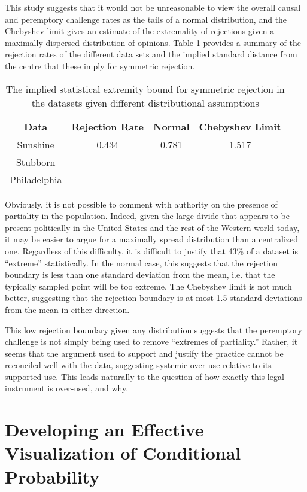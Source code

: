 This study suggests that it would not be unreasonable to view the overall causal and peremptory challenge rates as the tails of a
normal distribution, and the Chebyshev limit gives an estimate of the extremality of rejections given a maximally dispersed
distribution of opinions. Table \ref{tab:rejbounds} provides a summary of the rejection rates of the different data sets and the
implied standard distance from the centre that these imply for symmetric rejection.

\begin{table}
  \centering
  \label{tab:rejbounds}
  \caption[Implied Rejection Boundaries]{The implied statistical extremity bound for symmetric rejection in the datasets given
    different distributional assumptions}
  \begin{tabular}{|c|c|c|c|} \hline
    Data & Rejection Rate & Normal & Chebyshev Limit \\ \hline
    Sunshine & 0.434 & 0.781 & 1.517 \\
    Stubborn & & & \\
    Philadelphia & & & \\
    \hline
  \end{tabular}
\end{table}

Obviously, it is not possible to comment with authority on the presence of partiality in the population. Indeed, given the large
divide that appears to be present politically in the United States and the rest of the Western world today, it may be easier to
argue for a maximally spread distribution than a centralized one. Regardless of this difficulty, it is difficult to justify that
43\% of a dataset is ``extreme'' statistically. In the normal case, this suggests that the rejection boundary is less than one
standard deviation from the mean, i.e. that the typically sampled point will be too extreme. The Chebyshev limit is not much
better, suggesting that the rejection boundary is at most 1.5 standard deviations from the mean in either direction.

This low rejection boundary given any distribution suggests that the peremptory challenge is not simply being used to remove
``extremes of partiality.'' Rather, it seems that the argument used to support and justify the practice cannot be reconciled well
with the data, suggesting systemic over-use relative to its supported use. This leads naturally to the question of how exactly
this legal instrument is over-used, and why.

\section{Developing an Effective Visualization of Conditional Probability} \label{sec:effvis}

